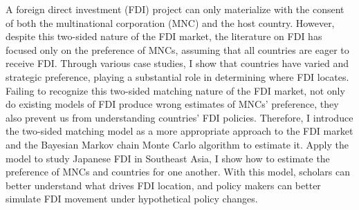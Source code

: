 \abstract

A foreign direct investment (FDI) project can only materialize with the consent of both the multinational corporation (MNC) and the host country. However, despite this two-sided nature of the FDI market, the literature on FDI has focused only on the preference of MNCs, assuming that all countries are eager to receive FDI. Through various case studies, I show that countries have varied and strategic preference, playing a substantial role in determining where FDI locates. Failing to recognize this two-sided matching nature of the FDI market, not only do existing models of FDI produce wrong estimates of MNCs' preference, they also prevent us from understanding countries' FDI policies. Therefore, I introduce the two-sided matching model as a more appropriate approach to the FDI market and the Bayesian Markov chain Monte Carlo algorithm to estimate it. Apply the model to study Japanese FDI in Southeast Asia, I show how to estimate the preference of MNCs and countries for one another. With this model, scholars can better understand what drives FDI location, and policy makers can better simulate FDI movement under hypothetical policy changes.